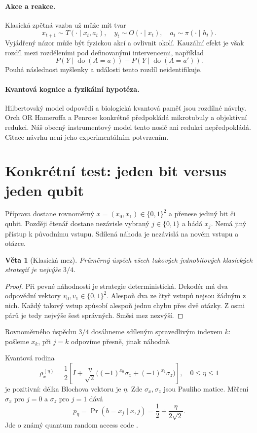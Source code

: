 \documentclass[11pt,a4paper]{article}
\newtheorem{theorem}{Věta}
\begin{document}
\paragraph{Akce a reakce.}
Klasická zpětná vazba už může mít tvar
\[
x_{t+1}\sim T(\cdot\mid x_t,a_t),\quad
y_t\sim O(\cdot\mid x_t),\quad a_t\sim\pi(\cdot\mid h_t).
\]
Vyjádřený názor může být fyzickou akcí a ovlivnit okolí.
Kauzální efekt je však rozdíl mezi rozděleními pod definovanými intervencemi, například
\[
P(Y\mid\operatorname{do}(A=a))-P(Y\mid\operatorname{do}(A=a')).
\]
Pouhá následnost myšlenky a události tento rozdíl neidentifikuje.

\paragraph{Kvantová kognice a fyzikální hypotéza.}
Hilbertovský model odpovědí a biologická kvantová paměť jsou rozdílné návrhy. Orch OR Hameroffa a Penrose \cite{orch} konkrétně předpokládá mikrotubuly a objektivní redukci. Náš obecný instrumentový model tento nosič ani redukci nepředpokládá. Citace návrhu není jeho experimentálním potvrzením.

\newpage
\section{Konkrétní test: jeden bit versus jeden qubit}
Příprava dostane rovnoměrný $x=(x_0,x_1)\in\{0,1\}^2$ a přenese jediný bit či qubit. Později čtenář dostane nezávisle vybraný $j\in\{0,1\}$ a hádá $x_j$. Nemá jiný přístup k původnímu vstupu. Sdílená náhoda je nezávislá na novém vstupu a otázce.

\begin{theorem}[Klasická mez]
Průměrný úspěch všech takových jednobitových klasických strategií je nejvýše $3/4$.
\end{theorem}
\begin{proof}
Při pevné náhodnosti je strategie deterministická. Dekodér má dva odpovědní vektory $v_0,v_1\in\{0,1\}^2$. Alespoň dva ze čtyř vstupů nejsou žádným z nich. Každý takový vstup způsobí alespoň jednu chybu přes dvě otázky. Z osmi párů je tedy nejvýše šest správných. Směsi mez nezvýší.
\end{proof}
Rovnoměrného úspěchu $3/4$ dosáhneme sdíleným spravedlivým indexem $k$: pošleme $x_k$, při $j=k$ odpovíme přesně, jinak náhodně.

Kvantová rodina
\[
\rho_x^{(\eta)}=\frac12\left[I+\frac{\eta}{\sqrt2}
\big((-1)^{x_0}\sigma_x+(-1)^{x_1}\sigma_z\big)\right],
\quad 0\leq\eta\leq1
\]
je pozitivní: délka Blochova vektoru je $\eta$. Zde $\sigma_x,\sigma_z$ jsou Pauliho matice. Měření $\sigma_x$ pro $j=0$ a $\sigma_z$ pro $j=1$ dává
\[
p_\eta=\Pr(b=x_j\mid x,j)=\frac12+\frac{\eta}{2\sqrt2}.
\]
Jde o známý quantum random access code \cite{rac}.
\end{document}
